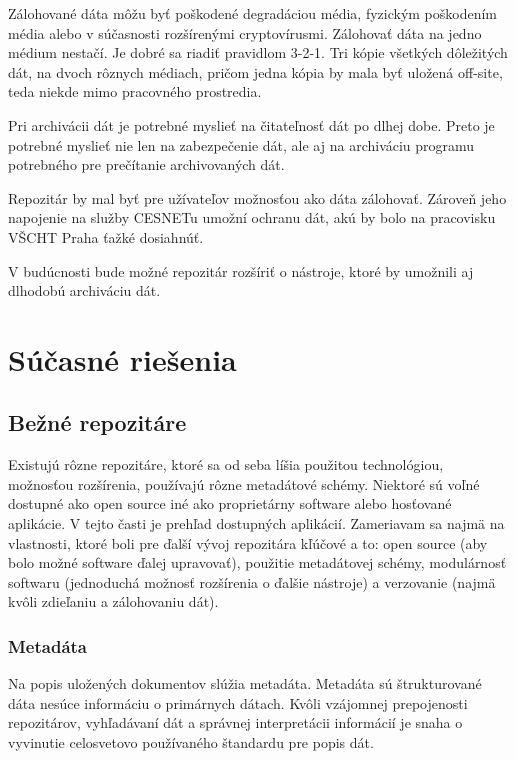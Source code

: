 \documentclass[thesis=M,slovak]{FITthesis}[2013/05/06]
\begin{document}
Zálohované dáta môžu byť poškodené degradáciou média, fyzickým poškodením média alebo v súčasnosti rozšírenými cryptovírusmi. Zálohovať dáta na jedno médium nestačí. Je dobré sa riadiť pravidlom 3-2-1. Tri kópie všetkých dôležitých dát, na dvoch rôznych médiach, pričom jedna kópia by mala byť uložená off-site, teda niekde mimo pracovného prostredia. \cite{zalohovanie}

Pri archivácii dát je potrebné myslieť na čitateľnosť dát po dlhej dobe. Preto je potrebné myslieť nie len na zabezpečenie dát, ale aj na archiváciu programu potrebného pre prečítanie archivovaných dát.

Repozitár by mal byť pre užívateľov možnosťou ako dáta zálohovať. Zároveň jeho napojenie na služby CESNETu umožní ochranu dát, akú by bolo na pracovisku VŠCHT Praha ťažké dosiahnúť.

V budúcnosti bude možné repozitár rozšíriť o nástroje, ktoré by umožnili aj dlhodobú archiváciu dát.

\chapter{Súčasné riešenia}
\section{Bežné repozitáre}
Existujú rôzne repozitáre, ktoré sa od seba líšia použitou technológiou, možnosťou rozšírenia, používajú rôzne metadátové schémy. Niektoré sú voľné dostupné ako open source iné ako proprietárny software alebo hosťované aplikácie. V tejto časti je prehľad dostupných aplikácií. Zameriavam sa najmä na vlastnosti, ktoré boli pre ďalší vývoj repozitára kľúčové a to: open source (aby bolo možné software ďalej upravovať), použitie metadátovej schémy, modulárnosť softwaru (jednoduchá možnosť rozšírenia o ďalšie nástroje) a verzovanie (najmä kvôli zdieľaniu a zálohovaniu dát).


\subsection{Metadáta}
Na popis uložených dokumentov slúžia metadáta. Metadáta sú štrukturované dáta nesúce informáciu o primárnych dátach.\cite{iso8459-5} Kvôli vzájomnej prepojenosti repozitárov, vyhľadávaní dát a správnej interpretácii informácií je snaha o vyvinutie celosvetovo používaného štandardu pre popis dát.
\end{document}
